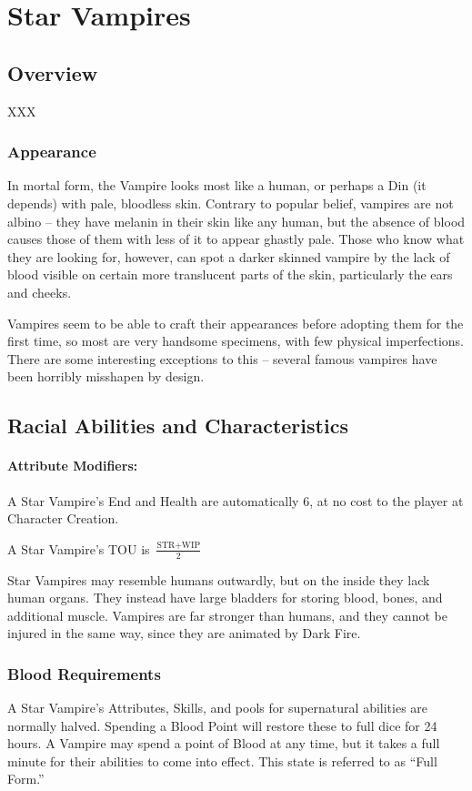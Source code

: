 \documentclass[oneside,11pt,english]{book}
\begin{document}
\section{Star Vampires}
\subsection*{Overview} 
XXX
\subsubsection*{Appearance}
In mortal form, the Vampire looks most like a human, or perhaps a Din (it depends) with pale, 
bloodless skin. Contrary to popular belief, vampires are not albino -- they have melanin in their 
skin like any human, but the absence of blood causes those of them with less of it to appear 
ghastly pale. Those who know what they are looking for, however, can spot a darker skinned 
vampire by the lack of blood visible on certain more translucent parts of the skin, particularly the 
ears and cheeks.

Vampires seem to be able to craft their appearances before adopting them for the first time, so 
most are very handsome specimens, with few physical imperfections. There are some 
interesting exceptions to this -- several famous vampires have been horribly misshapen by 
design.
\subsection*{Racial Abilities and Characteristics} 
\paragraph{Attribute Modifiers:} A Star Vampire’s End and Health are automatically 6, at no cost to the player at Character Creation.

A Star Vampire’s TOU is $ \frac{\text{STR}+\text{WIP}}{2} $

Star Vampires may resemble humans outwardly, but on the inside they lack human organs. They instead have large bladders for storing blood, bones, and additional muscle. Vampires are far stronger than humans, and they cannot be injured in the same way, since they are animated by Dark Fire.

\subsubsection{Blood Requirements}
A Star Vampire's Attributes, Skills, and pools for supernatural abilities are normally halved. 
Spending a Blood Point will restore these to full dice for 24 hours. A Vampire may spend a point 
of Blood at any time, but it takes a full minute for their abilities to come into effect. This state is 
referred to as “Full Form.”
\end{document}
